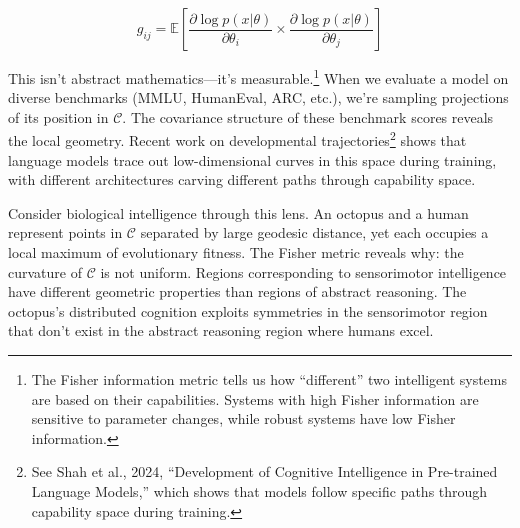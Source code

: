 \begin{equation}
g_{ij} = \mathbb{E}\left[\frac{\partial \log p(x|\theta)}{\partial \theta_i} \times \frac{\partial \log p(x|\theta)}{\partial \theta_j}\right]
\end{equation}

This isn't abstract mathematics---it's measurable.\footnote{The Fisher information metric tells us how ``different'' two intelligent systems are based on their capabilities. Systems with high Fisher information are sensitive to parameter changes, while robust systems have low Fisher information.} When we evaluate a model on diverse benchmarks (MMLU, HumanEval, ARC, etc.), we're sampling projections of its position in $\mathcal{C}$. The covariance structure of these benchmark scores reveals the local geometry. Recent work on developmental trajectories\footnote{See Shah et al., 2024, ``Development of Cognitive Intelligence in Pre-trained Language Models,'' which shows that models follow specific paths through capability space during training.} shows that language models trace out low-dimensional curves in this space during training, with different architectures carving different paths through capability space.

Consider biological intelligence through this lens. An octopus and a human represent points in $\mathcal{C}$ separated by large geodesic distance, yet each occupies a local maximum of evolutionary fitness. The Fisher metric reveals why: the curvature of $\mathcal{C}$ is not uniform. Regions corresponding to sensorimotor intelligence have different geometric properties than regions of abstract reasoning. The octopus's distributed cognition exploits symmetries in the sensorimotor region that don't exist in the abstract reasoning region where humans excel.

